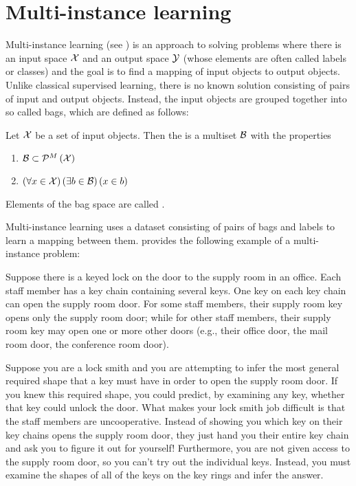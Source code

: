 \section{Multi-instance learning}
Multi-instance learning (see \cite{dietterich_solving_1997}) is an approach to solving problems where there is an input space \( \mathcal{X} \) and an output space \( \mathcal{Y} \) (whose elements are often called labels or classes) and the goal is to find a mapping of input objects to output objects. Unlike classical supervised learning, there is no known solution consisting of pairs of input and output objects. Instead, the input objects are grouped together into so called bags, which are defined as follows:

\begin{define}
	Let \( \mathcal{X} \) be a set of input objects. Then the  is a multiset \( \mathcal{B} \) with the properties
	\begin{enumerate}
		\item \( \mathcal{B} \subset \mathcal{P}^M \left( \mathcal{X} \right) \)
		\item \( \left( \forall x \in \mathcal{X} \right) \left( \exists b \in \mathcal{B} \right) \left( x \in b \right) \)
	\end{enumerate}
	Elements of the bag space are called .
\end{define}

Multi-instance learning uses a dataset consisting of pairs of bags and labels to learn a mapping between them. \cite{dietterich_solving_1997} provides the following example of a multi-instance problem:

\begin{example}
	Suppose there is a keyed lock on the door to the supply room in an office. Each staff member has a key chain containing several keys. One key on each key chain can open the supply room door. For some staff members, their supply room key opens only the supply room door; while for other staff members, their supply room key may open one or more other doors (e.g., their office door, the mail room door, the conference room door).

	Suppose you are a lock smith and you are attempting to infer the most general required shape that a key must have in order to open the supply room door. If you knew this required shape, you could predict, by examining any key, whether that key could unlock the door. What makes your lock smith job difficult is that the staff members are uncooperative. Instead of showing you which key on their key chains opens the supply room door, they just hand you their entire key chain and ask you to figure it out for yourself! Furthermore, you are not given access to the supply room door, so you can’t try out the individual keys. Instead, you must examine the shapes of all of the keys on the key rings and infer the answer.
\end{example}


